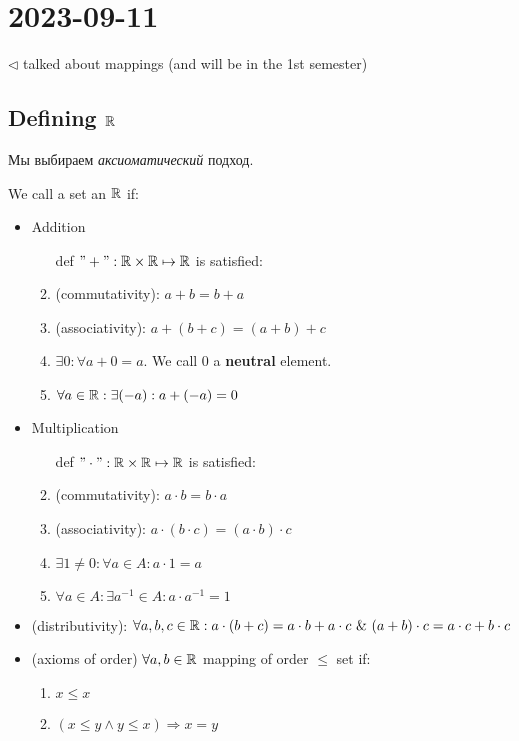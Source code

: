 \section{2023-09-11}

$ \triangleleft $ talked about mappings (and will be in the 1st semester)

\subsection{Defining $\R$}

Мы выбираем \textit{аксиоматический} подход. 

\begin{definition}[$\R$]
	We call a set an $\R$ if:
	\begin{itemize}
		\item Addition
			\begin{enumerate}
				\item[def] $"+" : \mathbb{R} \times \mathbb{R} \mapsto \mathbb{R}$ is satisfied:
				\item (commutativity): $a + b = b + a$
				\item (associativity): $a + (b + c) = (a + b) + c$ 
				\item $\exists 0: \forall a + 0 = a$. We call 0 a \textbf{neutral} element. 
				\item $\forall a \in \mathbb{R} : \exists (-a): a + (-a) = 0$ 
			\end{enumerate}
		\item Multiplication 
			\begin{enumerate}
				\item [def] $"\cdot" : \mathbb{R} \times \mathbb{R} \mapsto \mathbb{R}$ is satisfied:
				\item (commutativity): $a \cdot b = b \cdot a$
				\item (associativity): $a \cdot (b \cdot c) = (a \cdot b)\cdot c$
				\item $\exists 1 \neq 0: \forall a \in A: a \cdot 1 = a$
				\item $\forall a \in A: \exists a^{-1} \in A: a \cdot a^{-1} = 1$ 
			\end{enumerate}
		\item (distributivity): $\forall a,b,c \in \mathbb{R}: a \cdot (b+c) = a \cdot b + a \cdot c \ \& \ (a+b) \cdot c = a \cdot c + b \cdot c$ 
		\item (axioms of order) $\forall a,b \in \mathbb{R}$ mapping of order $ \leq $ set if:
			\begin{enumerate}
				\item $x \leq x$
				\item $(x \leq y \wedge y \leq x) \Rightarrow x = y$  

\end{enumerate}
\end{itemize}
\end{definition}
